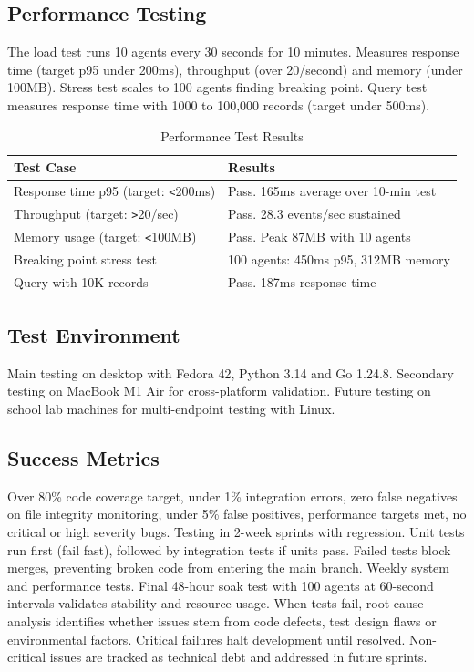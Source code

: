 \documentclass[conference]{IEEEtran}
\begin{document}
\subsection{Performance Testing}

The load test runs 10 agents every 30 seconds for 10 minutes. Measures response time (target p95 under 200ms), throughput (over 20/second) and memory (under 100MB). Stress test scales to 100 agents finding breaking point. Query test measures response time with 1000 to 100,000 records (target under 500ms).

\begin{table}[h]
\centering
\caption{Performance Test Results}
\begin{tabular}{|p{4cm}|p{4cm}|}
\hline
\textbf{Test Case} & \textbf{Results} \\
\hline
Response time p95 (target: \verb|<|200ms) & Pass. 165ms average over 10-min test \\
\hline
Throughput (target: \verb|>|20/sec) & Pass. 28.3 events/sec sustained \\
\hline
Memory usage (target: \verb|<|100MB) & Pass. Peak 87MB with 10 agents \\
\hline
Breaking point stress test & 100 agents: 450ms p95, 312MB memory \\
\hline
Query with 10K records & Pass. 187ms response time \\
\hline
\end{tabular}
\end{table}

\subsection{Test Environment}

Main testing on desktop with Fedora 42, Python 3.14 and Go 1.24.8. Secondary testing on MacBook M1 Air for cross-platform validation. Future testing on school lab machines for multi-endpoint testing with Linux.

\subsection{Success Metrics}

Over 80\% code coverage target, under 1\% integration errors, zero false negatives on file integrity monitoring, under 5\% false positives, performance targets met, no critical or high severity bugs. Testing in 2-week sprints with regression. Unit tests run first (fail fast), followed by integration tests if units pass. Failed tests block merges, preventing broken code from entering the main branch. Weekly system and performance tests. Final 48-hour soak test with 100 agents at 60-second intervals validates stability and resource usage. When tests fail, root cause analysis identifies whether issues stem from code defects, test design flaws or environmental factors. Critical failures halt development until resolved. Non-critical issues are tracked as technical debt and addressed in future sprints.
\end{document}
